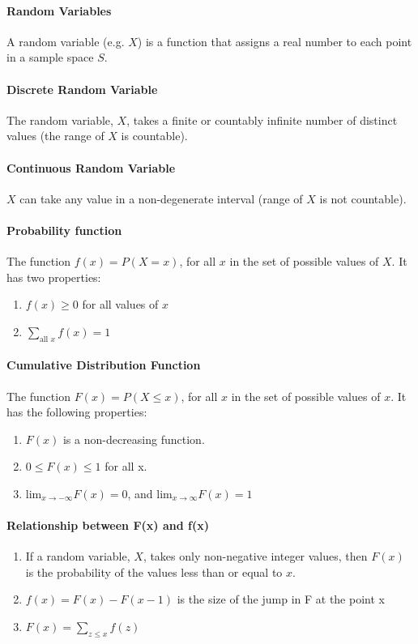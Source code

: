 \documentclass[10pt,letter]{article}
\begin{document}
\paragraph{Random Variables}
A random variable (e.g. $X$) is a function that assigns a real number to each point in a sample space $S$. 

\paragraph{Discrete Random Variable}
The random variable, $X$, takes a finite or countably infinite number of distinct values (the range of $X$ is countable). 

\paragraph{Continuous Random Variable}
$X$ can take any value in a non-degenerate interval (range of $X$ is not countable). 

\paragraph{Probability function}
The function $f(x)=P(X=x)$, for all $x$ in the set of possible values of $X$. It has two properties: \begin{enumerate}
    \item $f(x)\geq 0$ for all values of $x$ 
    \item $\sum_{\text{all }x}f(x)=1$
\end{enumerate}

\paragraph{Cumulative Distribution Function}
The function $F(x)=P(X\leq x)$, for all $x$ in the set of possible values of $x$. It has the following properties: \begin{enumerate}
    \item $F(x)$ is a non-decreasing function.
    \item $0\leq F(x)\leq 1$ for all x.
    \item lim$_{x\rightarrow-\infty}F(x)=0$, and lim$_{x\rightarrow\infty}F(x)=1$
\end{enumerate}

\paragraph{Relationship between F(x) and f(x)}
\begin{enumerate}
    \item If a random variable, $X$, takes only non-negative integer values, then $F(x)$ is the probability of the values less than or equal to $x$.
    \item $f(x)=F(x)-F(x-1)$ is the size of the jump in F at the point x
    \item $F(x)=\sum_{z\leq x}f(z)$
\end{enumerate}
\end{document}

